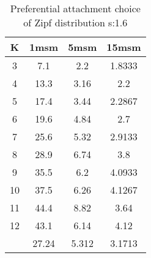 \begin{table}[H]
\centering
\begin{tabular}{c|ccc}
K &1msm &5msm &15msm\\
\hline
3 & 7.1 & 2.2 & 1.8333\\
4 & 13.3 & 3.16 & 2.2\\
5 & 17.4 & 3.44 & 2.2867\\
6 & 19.6 & 4.84 & 2.7\\
7 & 25.6 & 5.32 & 2.9133\\
8 & 28.9 & 6.74 & 3.8\\
9 & 35.5 & 6.2 & 4.0933\\
10 & 37.5 & 6.26 & 4.1267\\
11 & 44.4 & 8.82 & 3.64\\
12 & 43.1 & 6.14 & 4.12\\
\hline
& 27.24 & 5.312 & 3.1713\\
\end{tabular}
\caption{Preferential attachment choice of Zipf distribution s:1.6}
\label{tab:s1.6}
\end{table}
